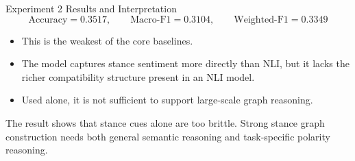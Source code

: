 \documentclass[aspectratio=169, 10pt]{beamer}
\newcommand{\researchbox}[2]{%
  \begin{tcolorbox}[colback=accentorange!10, colframe=accentorange,
    title={\textbf{Research Lens:} #1}, fonttitle=\bfseries\small,
    left=4pt, right=4pt, top=3pt, bottom=3pt, boxrule=1pt]
    \small #2
  \end{tcolorbox}}
\begin{document}
\begin{frame}{Experiment 2 Results and Interpretation}
\[
\text{Accuracy}=0.3517,\qquad
\text{Macro-F1}=0.3104,\qquad
\text{Weighted-F1}=0.3349
\]

\begin{itemize}
  \item This is the weakest of the core baselines.
  \item The model captures stance sentiment more directly than NLI, but it lacks the richer compatibility structure present in an NLI model.
  \item Used alone, it is not sufficient to support large-scale graph reasoning.
\end{itemize}

\researchbox{Interpretation}{
The result shows that stance cues alone are too brittle. Strong stance graph construction needs both general semantic reasoning and task-specific polarity reasoning.
}
\end{frame}
\end{document}
